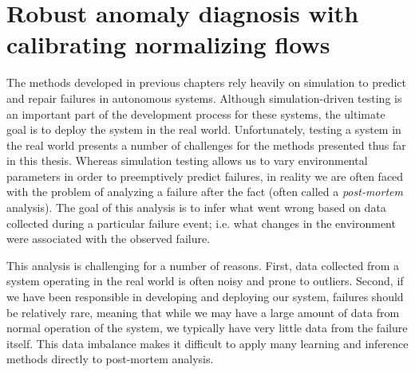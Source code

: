 \chapter{Robust anomaly diagnosis with calibrating normalizing flows}\label{ch:icml}

The methods developed in previous chapters rely heavily on simulation to predict and repair failures in autonomous systems. Although simulation-driven testing is an important part of the development process for these systems, the ultimate goal is to deploy the system in the real world. Unfortunately, testing a system in the real world presents a number of challenges for the methods presented thus far in this thesis. Whereas simulation testing allows us to vary environmental parameters in order to preemptively predict failures, in reality we are often faced with the problem of analyzing a failure after the fact (often called a \textit{post-mortem} analysis). The goal of this analysis is to infer what went wrong based on data collected during a particular failure event; i.e. what changes in the environment were associated with the observed failure.

This analysis is challenging for a number of reasons. First, data collected from a system operating in the real world is often noisy and prone to outliers. Second, if we have been responsible in developing and deploying our system, failures should be relatively rare, meaning that while we may have a large amount of data from normal operation of the system, we typically have very little data from the failure itself. This data imbalance makes it difficult to apply many learning and inference methods directly to post-mortem analysis.

